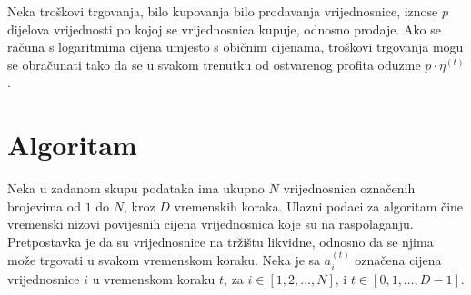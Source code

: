 \documentclass[lmodern, utf8, diplomski, numeric]{fer}
\newcommand{\q}{\left}
\newcommand{\w}{\right}
\begin{document}
  Neka troškovi trgovanja, bilo kupovanja bilo prodavanja vrijednosnice, iznose $p$ dijelova vrijednosti po kojoj se vrijednosnica kupuje, odnosno prodaje.
  Ako se računa s logaritmima cijena umjesto s običnim cijenama, troškovi trgovanja mogu se obračunati tako da se u svakom trenutku od ostvarenog profita oduzme $p \cdot \eta^{(t)}$.
  
%  
  
\chapter{Algoritam}

  Neka u zadanom skupu podataka ima ukupno $N$ vrijednosnica označenih brojevima od $1$ do $N$, kroz $D$ vremenskih koraka.
  Ulazni podaci za algoritam čine vremenski nizovi povijesnih cijena vrijednosnica koje su na raspolaganju.
  Pretpostavka je da su vrijednosnice na tržištu likvidne, odnosno da se njima može trgovati u svakom vremenskom koraku.
  Neka je sa $a_i^{\q(t\w)}$ označena cijena vrijednosnice $i$ u vremenskom koraku $t$, za $i \in {\q[1, 2, \ldots, N\w]}$, i $t \in {\q[0, 1, \ldots, D-1\w]}$.
  
\end{document}
